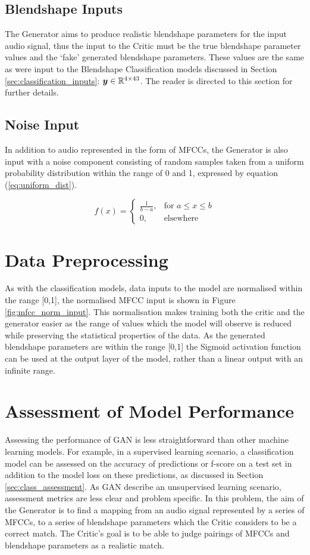 \subsection{Blendshape Inputs}
The Generator aims to produce realistic blendshape parameters for the input audio signal, thus the input to the Critic must be the true blendshape parameter values and the `fake' generated blendshape parameters.
These values are the same as were input to the Blendshape Classification models discussed in Section \ref{sec:classification_inputs}: ${\boldsymbol{{y}}} \in \mathbb{R}^{4 \times 43}$.
The reader is directed to this section for further details.

\subsection{Noise Input}
In addition to audio represented in the form of MFCCs, the Generator is also input with a noise component consisting of random samples taken from a uniform probability distribution within the range of 0 and 1, expressed by equation (\ref{eq:uniform_dist}).

\begin{equation}\label{eq:uniform_dist}
    f(x)=\begin{cases}
      \frac{1}{b-a}, & \text{for $a \leq x \leq b$}\\
      0, & \text{elsewhere}
    \end{cases}
\end{equation}

\section{Data Preprocessing}
As with the classification models, data inputs to the model are normalised within the range [0,1], the normalised MFCC input is shown in Figure \ref{fig:mfcc_norm_input}.
This normalisation makes training both the critic and the generator easier as the range of values which the model will observe is reduced while preserving the statistical properties of the data.
As the generated blendshape parameters are within the range [0,1] the Sigmoid activation function can be used at the output layer of the model, rather than a linear output with an infinite range.

\section{Assessment of Model Performance} \label{sec:gan_assessment}
Assessing the performance of GAN is less straightforward than other machine learning models.
For example, in a supervised learning scenario, a classification model can be assessed on the accuracy of predictions or f-score on a test set in addition to the model loss on these predictions, as discussed in Section \ref{sec:class_assessment}.
As GAN describe an unsupervised learning scenario, assessment metrics are less clear and problem specific.
In this problem, the aim of the Generator is to find a mapping from an audio signal represented by a series of MFCCs, to a series of blendshape parameters which the Critic considers to be a correct match.
The Critic's goal is to be able to judge pairings of MFCCs and blendshape parameters as a realistic match.

